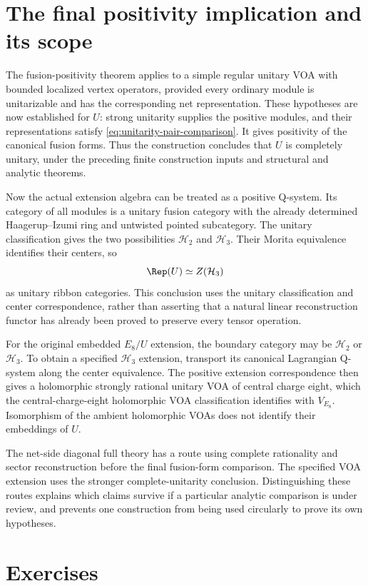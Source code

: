 \section{The final positivity implication and its scope}

The fusion-positivity theorem applies to a simple regular unitary
VOA with bounded localized vertex operators, provided every
ordinary module is unitarizable and has the corresponding net
representation. These hypotheses are now established for $U$:
strong unitarity supplies the positive modules, and their
representations satisfy
\eqref{eq:unitarity-pair-comparison}. It gives positivity of the
canonical fusion forms. Thus the construction concludes that $U$
is completely unitary, under the preceding finite construction
inputs and structural and analytic theorems.

Now the actual extension algebra can be treated as a positive
Q-system. Its category of all modules is a unitary fusion category
with the already determined Haagerup--Izumi ring and untwisted
pointed subcategory. The unitary classification gives the two
possibilities $\mathcal H_2$ and $\mathcal H_3$. Their Morita
equivalence identifies their centers, so
\[
 \Rep(U)\simeq Z(\mathcal H_3)
\]
as unitary ribbon categories. This conclusion uses the unitary
classification and center correspondence, rather than asserting
that a natural linear reconstruction functor has already been
proved to preserve every tensor operation.

For the original embedded $E_8/U$ extension, the boundary category
may be $\mathcal H_2$ or $\mathcal H_3$. To obtain a specified
$\mathcal H_3$ extension, transport its canonical Lagrangian
Q-system along the center equivalence. The positive extension
correspondence then gives a holomorphic strongly rational unitary
VOA of central charge eight, which the central-charge-eight holomorphic VOA classification
identifies with $V_{E_8}$. Isomorphism of the ambient holomorphic
VOAs does not identify their embeddings of $U$.

The net-side diagonal full theory has a route using complete
rationality and sector reconstruction before the final fusion-form
comparison. The specified VOA extension uses the stronger
complete-unitarity conclusion. Distinguishing these routes explains
which claims survive if a particular analytic comparison is under
review, and prevents one construction from being used circularly
to prove its own hypotheses.

\section{Exercises}

